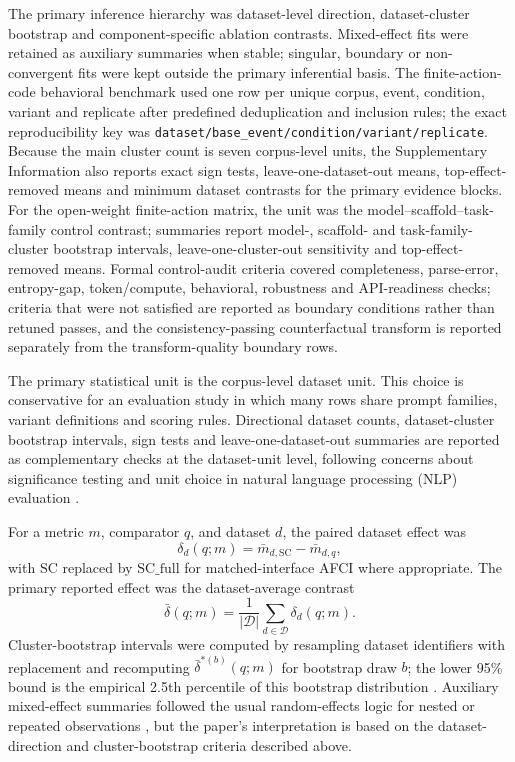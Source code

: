 ﻿\documentclass[preprint,12pt,authoryear]{elsarticle}
\begin{document}
The primary inference hierarchy was dataset-level direction, dataset-cluster bootstrap and component-specific ablation contrasts. Mixed-effect fits were retained as auxiliary summaries when stable; singular, boundary or non-convergent fits were kept outside the primary inferential basis. The finite-action-code behavioral benchmark used one row per unique corpus, event, condition, variant and replicate after predefined deduplication and inclusion rules; the exact reproducibility key was \texttt{dataset/base\_event/condition/variant/replicate}. Because the main cluster count is seven corpus-level units, the Supplementary Information also reports exact sign tests, leave-one-dataset-out means, top-effect-removed means and minimum dataset contrasts for the primary evidence blocks. For the open-weight finite-action matrix, the unit was the model--scaffold--task-family control contrast; summaries report model-, scaffold- and task-family-cluster bootstrap intervals, leave-one-cluster-out sensitivity and top-effect-removed means. Formal control-audit criteria covered completeness, parse-error, entropy-gap, token/compute, behavioral, robustness and API-readiness checks; criteria that were not satisfied are reported as boundary conditions rather than retuned passes, and the consistency-passing counterfactual transform is reported separately from the transform-quality boundary rows.

The primary statistical unit is the corpus-level dataset unit. This choice is conservative for an evaluation study in which many rows share prompt families, variant definitions and scoring rules. Directional dataset counts, dataset-cluster bootstrap intervals, sign tests and leave-one-dataset-out summaries are reported as complementary checks at the dataset-unit level, following concerns about significance testing and unit choice in natural language processing (NLP) evaluation \citep{dror2018hitchhiker}.

For a metric \(m\), comparator \(q\), and dataset \(d\), the paired dataset effect was
\begin{equation}
\delta_d(q;m)=\bar{m}_{d,\mathrm{SC}}-\bar{m}_{d,q},
\end{equation}
with \(\mathrm{SC}\) replaced by \(\mathrm{SC\_full}\) for matched-interface AFCI where appropriate. The primary reported effect was the dataset-average contrast
\begin{equation}
\bar{\delta}(q;m)=\frac{1}{|\mathcal{D}|}\sum_{d\in\mathcal{D}}\delta_d(q;m).
\end{equation}
Cluster-bootstrap intervals were computed by resampling dataset identifiers with replacement and recomputing \(\bar{\delta}^{*(b)}(q;m)\) for bootstrap draw \(b\); the lower 95\% bound is the empirical 2.5th percentile of this bootstrap distribution \citep{efron1993bootstrap}. Auxiliary mixed-effect summaries followed the usual random-effects logic for nested or repeated observations \citep{laird1982random}, but the paper's interpretation is based on the dataset-direction and cluster-bootstrap criteria described above.
\end{document}
